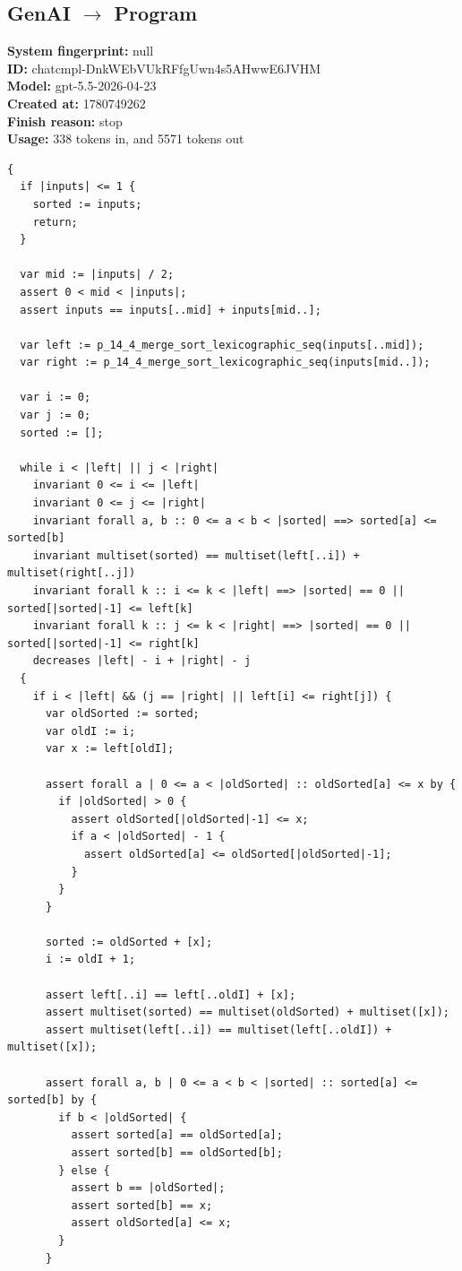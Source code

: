 \documentclass{article}
\begin{document}
\subsection*{GenAI $\rightarrow$ Program}
\textbf{System fingerprint: }null
\\\textbf{ID: }chatcmpl-DnkWEbVUkRFfgUwn4s5AHwwE6JVHM
\\\textbf{Model: }gpt-5.5-2026-04-23
\\\textbf{Created at: }1780749262
\\\textbf{Finish reason: }stop
\\\textbf{Usage: }338 tokens in, and 5571 tokens out
\begin{lstlisting}
{
  if |inputs| <= 1 {
    sorted := inputs;
    return;
  }

  var mid := |inputs| / 2;
  assert 0 < mid < |inputs|;
  assert inputs == inputs[..mid] + inputs[mid..];

  var left := p_14_4_merge_sort_lexicographic_seq(inputs[..mid]);
  var right := p_14_4_merge_sort_lexicographic_seq(inputs[mid..]);

  var i := 0;
  var j := 0;
  sorted := [];

  while i < |left| || j < |right|
    invariant 0 <= i <= |left|
    invariant 0 <= j <= |right|
    invariant forall a, b :: 0 <= a < b < |sorted| ==> sorted[a] <= sorted[b]
    invariant multiset(sorted) == multiset(left[..i]) + multiset(right[..j])
    invariant forall k :: i <= k < |left| ==> |sorted| == 0 || sorted[|sorted|-1] <= left[k]
    invariant forall k :: j <= k < |right| ==> |sorted| == 0 || sorted[|sorted|-1] <= right[k]
    decreases |left| - i + |right| - j
  {
    if i < |left| && (j == |right| || left[i] <= right[j]) {
      var oldSorted := sorted;
      var oldI := i;
      var x := left[oldI];

      assert forall a | 0 <= a < |oldSorted| :: oldSorted[a] <= x by {
        if |oldSorted| > 0 {
          assert oldSorted[|oldSorted|-1] <= x;
          if a < |oldSorted| - 1 {
            assert oldSorted[a] <= oldSorted[|oldSorted|-1];
          }
        }
      }

      sorted := oldSorted + [x];
      i := oldI + 1;

      assert left[..i] == left[..oldI] + [x];
      assert multiset(sorted) == multiset(oldSorted) + multiset([x]);
      assert multiset(left[..i]) == multiset(left[..oldI]) + multiset([x]);

      assert forall a, b | 0 <= a < b < |sorted| :: sorted[a] <= sorted[b] by {
        if b < |oldSorted| {
          assert sorted[a] == oldSorted[a];
          assert sorted[b] == oldSorted[b];
        } else {
          assert b == |oldSorted|;
          assert sorted[b] == x;
          assert oldSorted[a] <= x;
        }
      }


\end{lstlisting}
\end{document}
